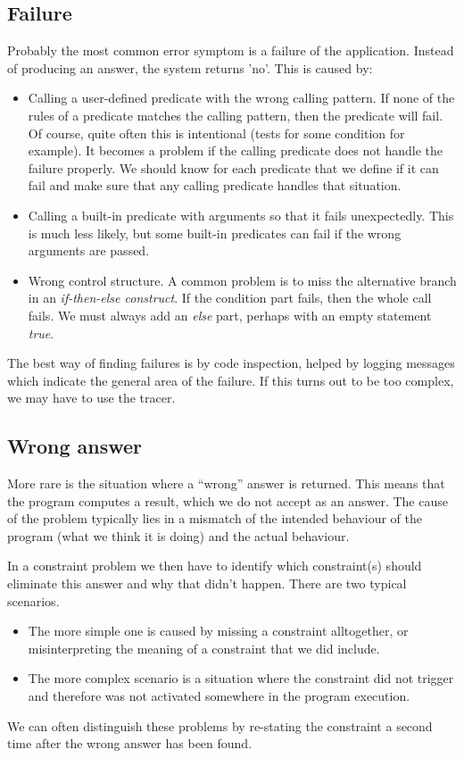\documentclass[a4paper,12pt]{report}
\begin{document}
\subsection{Failure} Probably the most common error symptom is a failure of the application. Instead of producing an answer, the system returns 'no'. This is caused by: 
\begin{itemize}
\item Calling a user-defined predicate with the wrong calling pattern. If none of the rules of a predicate matches the calling pattern, then the predicate will fail. Of course, quite often this is intentional (tests for some condition for example). It becomes a problem if the calling predicate does not handle the failure properly. We should know for each predicate that we define if it can fail and make sure that any calling predicate handles that situation.
\item Calling a built-in predicate with arguments so that it fails unexpectedly. This is much less likely, but some built-in predicates can fail if the wrong arguments are passed.
\item Wrong control structure. A common problem is to miss the alternative branch in an {\it if-then-else construct}. If the condition part fails, then the whole call fails. We must always add an {\it else} part, perhaps with an empty statement {\it true}.
\end{itemize}
The best way of finding failures is by code inspection, helped by logging messages which indicate the general area of the failure. If this turns out to be too complex, we may have to use the tracer.

\subsection{Wrong answer} 
More rare is the situation where a ``wrong'' answer is returned. This means that the program computes a result, which we do not accept as an answer. The cause of the problem typically lies in a mismatch of the intended behaviour of the program (what we think it is doing) and the actual behaviour.

In a constraint problem we then have to identify which constraint(s) should eliminate this answer and why that didn't happen. There are two typical scenarios.

\begin{itemize}
\item The more simple one is caused by missing a constraint alltogether, or misinterpreting the meaning of a constraint that we did include. 
\item The more complex scenario is a situation where the constraint did not trigger and therefore was not activated somewhere in the program execution. 
\end{itemize}
We can often distinguish these problems by re-stating the constraint a second time after the wrong answer has been found. 
\end{document}
